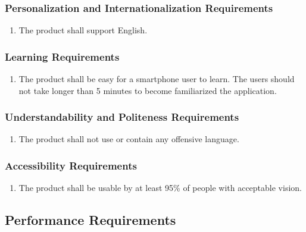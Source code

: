 \documentclass[]{article}
\begin{document}
\subsubsection{Personalization and Internationalization Requirements}
\label{ssub:personalization_and_internationalization_requirements}
\begin{enumerate}[{UH}2. ]
	\item The product shall support English.
\end{enumerate}

\subsubsection{Learning Requirements}
\label{ssub:learning_requirements}
\begin{enumerate}[{UH}3. ]
	\item The product shall be easy for a smartphone user to learn. The users should not take longer than 5 minutes to become familiarized the application.
\end{enumerate}

\subsubsection{Understandability and Politeness Requirements}
\label{ssub:understandability_and_politeness_requirements}
\begin{enumerate}[{UH}4. ]
	\item The product shall not use or contain any offensive language.
\end{enumerate}

\subsubsection{Accessibility Requirements}
\label{ssub:accessibility_requirements}
\begin{enumerate}[{UH}5. ]
	\item The product shall be usable by at least 95\% of people with acceptable vision.
\end{enumerate}


\subsection{Performance Requirements}
\label{sub:performance_requirements}
\end{document}

